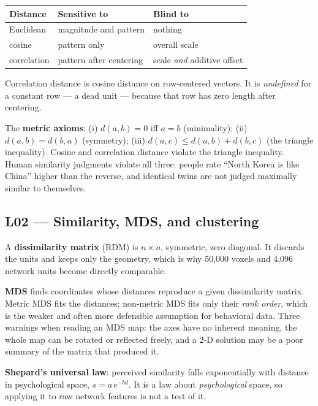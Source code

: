 \documentclass[11pt]{article}
\begin{document}
\begin{center}
\begin{tabular}{@{}lll@{}}
\toprule
Distance & Sensitive to & Blind to \\
\midrule
Euclidean & magnitude and pattern & nothing \\
cosine & pattern only & overall scale \\
correlation & pattern after centering & scale \emph{and} additive offset \\
\bottomrule
\end{tabular}
\end{center}

Correlation distance is cosine distance on row-centered vectors. It is
\emph{undefined} for a constant row --- a dead unit --- because that row has zero
length after centering.

The \textbf{metric axioms}: (i) $d(a,b) = 0$ iff $a = b$ (minimality);
(ii) $d(a,b) = d(b,a)$ (symmetry); (iii) $d(a,c) \le d(a,b) + d(b,c)$ (the
triangle inequality). Cosine and correlation distance violate the triangle
inequality. Human similarity judgments violate all three: people rate ``North
Korea is like China'' higher than the reverse, and identical twins are not
judged maximally similar to themselves.

\subsection{L02 --- Similarity, MDS, and clustering}

A \textbf{dissimilarity matrix} (RDM) is $n \times n$, symmetric, zero
diagonal. It discards the units and keeps only the geometry, which is why 50,000
voxels and 4,096 network units become directly comparable.

\textbf{MDS} finds coordinates whose distances reproduce a given dissimilarity
matrix. Metric MDS fits the distances; non-metric MDS fits only their
\emph{rank order}, which is the weaker and often more defensible assumption for
behavioral data. Three warnings when reading an MDS map: the axes have no
inherent meaning, the whole map can be rotated or reflected freely, and a
2-D solution may be a poor summary of the matrix that produced it.

\textbf{Shepard's universal law}: perceived similarity falls exponentially with
distance in psychological space, $s = a\,e^{-b d}$. It is a law about
\emph{psychological} space, so applying it to raw network features is not a test
of it.
\end{document}
